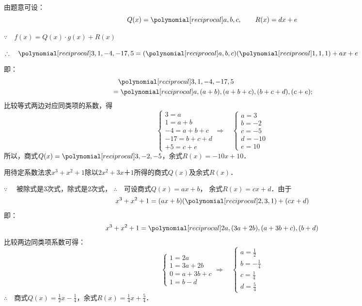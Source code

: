 \begin{solution}
    由题意可设：
\[Q(x)=\poly{a,b,c},\qquad R(x)=dx+e\]

$\because\quad f(x)=Q(x)\cdot g(x)+R(x)$   

$\therefore\quad \poly{3,1,-4,-17,5}=(\poly{a,b,c})(\poly{1,1,1})+ax+e$

即：
\[\begin{split}
    &\quad \poly{3,1,-4,-17,5}\\
    &=\poly{a,(a+b),(a+b+c),(b+c+d),(c+e)};
\end{split}\] 
比较等式两边对应同类项的系数，得
\[\begin{cases}
    3=a\\
    1=a+b\\
    -4=a+b+c\\
    -17=b+c+d\\
    +5=c+e
\end{cases}\Rightarrow\quad  \begin{cases}
    a=3\\
    b=-2\\
    c=-5\\
    d=-10\\
    e=10
\end{cases}\]
所以，商式$Q(x)=\poly{3,-2,-5}$，余式$R(x)=-10x+10$．
\end{solution}

\begin{example}
    用待定系数法求$x^3+x^2+1$除以$2x^2+3x＋1$所得的商式$Q(x)$及余式$R(x)$．
\end{example}

\begin{solution}
$\because\quad $ 被除式是3次式，除式是2次式，
$\therefore\quad $可设商式$Q(x)=ax+b$，
余式$R(x)=cx+d$．由于
\[x^3+x^2+1=(ax+b)(\poly{2,3,1})+(cx+d)\]
即：
\[x^3+x^2+1=\poly{2a, (3a+2b), (a+3b+c), (b+d)}\]
比较两边同类项系数可得：
\[\begin{cases}
  1=2a\\
  1=3a+2b\\
  0=a+3b+c\\
  1=b-d  
\end{cases}\Rightarrow\quad \begin{cases}
    a=\frac{1}{2}\\
    b=-\frac{1}{4}\\
    c=\frac{1}{4}\\
    d=\frac{5}{4}
\end{cases}\]
$\therefore\quad $商式$Q(x)=\frac{1}{2}x-\frac{1}{4}$，余式$R(x)=\frac{1}{4}x+\frac{5}{4}$．
\end{solution}

